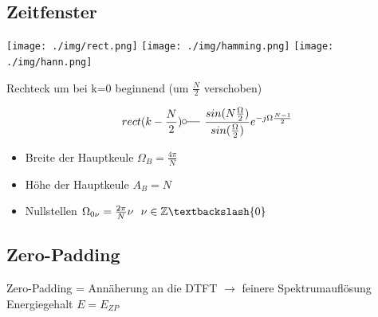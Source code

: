 \documentclass[10pt,a4paper]{article}
\begin{document}
\subsection{Zeitfenster}
  \begin{center}
      \texttt{[image: ./img/rect.png]}
      \texttt{[image: ./img/hamming.png]}
      \texttt{[image: ./img/hann.png]}
  \end{center}
  Rechteck um bei k=0 beginnend (um $\frac{N}{2}$ verschoben)
  \begin{mdframed}[style=exercise]
    \begin{align}
        rect(k-\frac{N}{2}) \fourier \frac{sin(N\frac{\Omega}{2})}{sin(\frac{\Omega}{2})} e^{-j\Omega\frac{N-1}{2}}
    \end{align}
  \end{mdframed}
  \begin{itemize}
    \item Breite der Hauptkeule $\Omega_B = \frac{4\pi}{N}$
    \item Höhe der Hauptkeule $A_B = N$
    \item Nullstellen $\Omega_{0\nu} = \frac{2\pi}{N}\nu \ \ \nu \in\mathbb{Z} \textbackslash\{0\}$
  \end{itemize}
\subsection{Zero-Padding}
Zero-Padding = Annäherung an die DTFT $\rightarrow$ feinere Spektrumauflösung Energiegehalt $E = E_{ZP}$ \\
\end{document}
